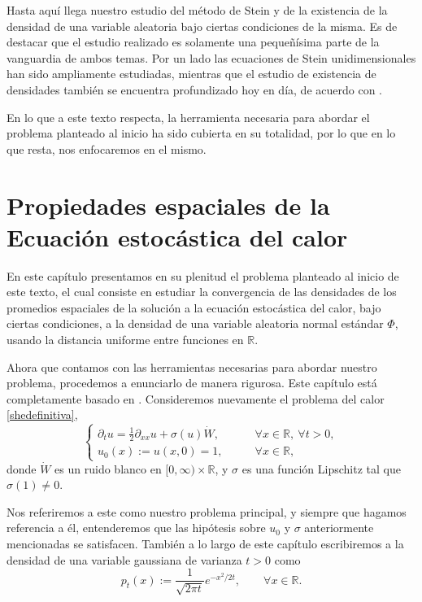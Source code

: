 \documentclass[letterpaper,twoside,12pt]{book}
\newcommand{\R}{\mathbb{R}}
\newcommand{\1}{\mathds{1}}
\theoremstyle{definition}
\theoremstyle{definition}
\theoremstyle{remark}
\theoremstyle{definition}
\theoremstyle{definition}
\theoremstyle{definition}
\theoremstyle{definition}
\theoremstyle{definition}
\begin{document}
Hasta aquí llega nuestro estudio del método de Stein y de la existencia de la densidad de una variable aleatoria bajo ciertas condiciones de la misma. Es de destacar que el estudio realizado es solamente una pequeñísima parte de la vanguardia de ambos temas. Por un lado las ecuaciones de Stein unidimensionales han sido ampliamente estudiadas, mientras que el estudio de existencia de densidades también se encuentra profundizado hoy en día, de acuerdo con \cite{Nourdin_Peccati_2012}. 

En lo que a este texto respecta, la herramienta necesaria para abordar el problema planteado al inicio ha sido cubierta en su totalidad, por lo que en lo que resta, nos enfocaremos en el mismo.


\chapter{Propiedades espaciales de la Ecuación estocástica del calor}
En este capítulo presentamos en su plenitud el problema planteado al inicio de este texto, el cual consiste en estudiar la convergencia de las densidades de los promedios espaciales de la solución a la ecuación estocástica del calor, bajo ciertas condiciones, a la densidad de una variable aleatoria normal estándar $\Phi$, usando la distancia uniforme entre funciones en $\R$.

Ahora que contamos con las herramientas necesarias para abordar nuestro problema, procedemos a enunciarlo de manera rigurosa. Este capítulo está completamente basado en \cite[pp. 68-71, 75-86]{KUZGUN202268}. Consideremos nuevamente el problema del calor \eqref{shedefinitiva},
\begin{equation*}
   \begin{cases}
      \partial_t u=\frac{1}{2}\partial_{xx}u+\sigma(u)\dot{W}, & \qquad \forall x\in \R, \ \forall t>0,\\
      u_0(x):=u(x,0)=1, & \qquad \forall x\in \R,
   \end{cases}
\end{equation*}
donde $\dot{W}$ es un ruido blanco en $[0,\infty)\times\R$, y $\sigma$ es una función Lipschitz tal que $\sigma(1)\neq 0$.

Nos referiremos a este como nuestro problema principal, y siempre que hagamos referencia a él, entenderemos que las hipótesis sobre $u_0$ y $\sigma$ anteriormente mencionadas se satisfacen. También a lo largo de este capítulo escribiremos a la densidad de una variable gaussiana de varianza $t>0$ como
\[
p_t(x):=\frac{1}{\sqrt{2\pi t}}e^{-x^2/2t}, \qquad \forall x\in \R.
\]
\end{document}
